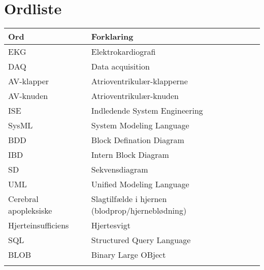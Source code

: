\chapter{Ordliste}

\begin{longtabu} to 
    Ord &    Forklaring\\
    \toprule 
	EKG	&	Elektrokardiografi\\
	DAQ	&	Data acquisition\\
	AV-klapper	&	Atrioventrikulær-klapperne\\
	AV-knuden	&	Atrioventrikulær-knuden\\
	ISE & Indledende System Engineering \\
	SysML & System Modeling Language \\
	BDD & Block Defination Diagram \\
	IBD & Intern Block Diagram\\
	SD & Sekvensdiagram\\
	UML & Unified Modeling Language\\
	Cerebral apopleksiske &	Slagtilfælde i hjernen (blodprop/hjerneblødning)\\
	Hjerteinsufficiens	&	Hjertesvigt\\
	SQL & Structured Query Language\\
	BLOB & Binary Large OBject\\
\label{forkort}
\end{longtabu}